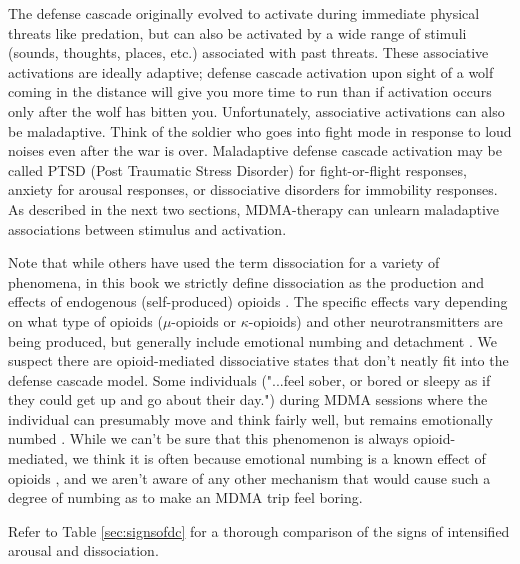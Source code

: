 \documentclass[12pt,letterpaper]{book}
\begin{document}
The defense cascade originally evolved to activate during immediate physical threats like predation, but can also be activated by a wide range of stimuli (sounds, thoughts, places, etc.) associated with past threats. These associative activations are ideally adaptive; defense cascade activation upon sight of a wolf coming in the distance will give you more time to run than if activation occurs only after the wolf has bitten you. Unfortunately, associative activations can also be maladaptive. Think of the soldier who goes into fight mode in response to loud noises even after the war is over. Maladaptive defense cascade activation may be called PTSD (Post Traumatic Stress Disorder) for fight-or-flight responses, anxiety for arousal responses, or dissociative disorders for immobility responses. As described in the next two sections, MDMA-therapy can unlearn maladaptive associations between stimulus and activation.

Note that while others have used the term dissociation for a variety of phenomena, in this book we strictly define dissociation as the production and effects of endogenous (self-produced) opioids \cite{kozlowskaDefenseCascade}. The specific effects vary depending on what type of opioids ($\mu$-opioids or $\kappa$-opioids) and other neurotransmitters are being produced, but generally include emotional numbing and detachment \cite{kozlowskaDefenseCascade,lanius2018review}. We suspect there are opioid-mediated dissociative states that don't neatly fit into the defense cascade model. Some individuals ("...feel sober, or bored or sleepy as if they could get up and go about their day.") during MDMA sessions where the individual can presumably move and think fairly well, but remains emotionally numbed \cite{razviPSIP}. While we can't be sure that this phenomenon is always opioid-mediated, we think it is often because emotional numbing is a known effect of opioids \cite{lanius2018review}, and we aren't aware of any other mechanism that would cause such a degree of numbing as to make an MDMA trip feel boring.


Refer to Table \ref{sec:signsofdc} for a thorough comparison of the signs of intensified arousal and dissociation.
\end{document}

